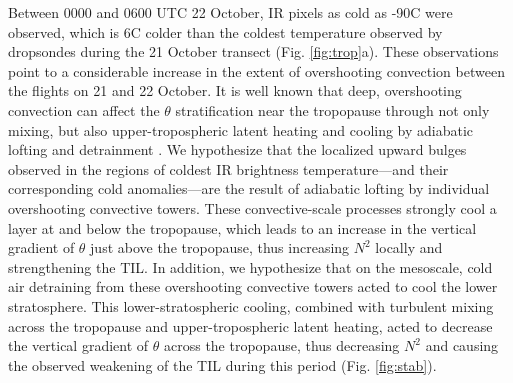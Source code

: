 Between 0000 and 0600 UTC 22 October, IR pixels as cold as -90\textdegree{}C were observed, which is 6\textdegree{}C colder than the coldest temperature observed by dropsondes during the 21 October transect (Fig. \ref{fig:trop}a).
These observations point to a considerable increase in the extent of overshooting convection between the flights on 21 and 22 October.
It is well known that deep, overshooting convection can affect the $\theta$ stratification near the tropopause through not only mixing, but also upper-tropospheric latent heating \citep{SalbyCallaghan2004} and cooling by adiabatic lofting \citep{Sherwoodetal2003} and detrainment \citep{Salbyetal2003}.
We hypothesize that the localized upward bulges observed in the regions of coldest IR brightness temperature---and their corresponding cold anomalies---are the result of adiabatic lofting by individual overshooting convective towers.
These convective-scale processes strongly cool a layer at and below the tropopause, which leads to an increase in the vertical gradient of $\theta$ just above the tropopause, thus increasing $N^2$ locally and strengthening the TIL.
In addition, we hypothesize that on the mesoscale, cold air detraining from these
overshooting convective towers acted to cool the lower stratosphere.
This lower-stratospheric cooling, combined with turbulent mixing across the tropopause and upper-tropospheric latent heating, acted to decrease the vertical gradient of $\theta$ across the tropopause, thus decreasing $N^2$ and causing the observed weakening of the TIL during this period (Fig. \ref{fig:stab}).


